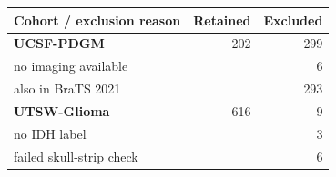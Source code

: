 \begin{tabular}{lrr}
\toprule
Cohort / exclusion reason & Retained & Excluded \\
\midrule
\textbf{UCSF-PDGM} & 202 & 299 \\
\quad no imaging available &  & 6 \\
\quad also in BraTS 2021 &  & 293 \\
\textbf{UTSW-Glioma} & 616 & 9 \\
\quad no IDH label &  & 3 \\
\quad failed skull-strip check &  & 6 \\
\bottomrule
\end{tabular}
